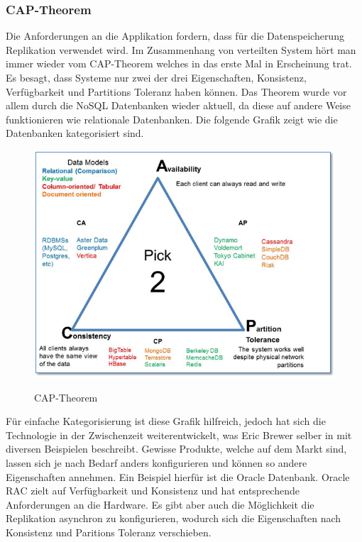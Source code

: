 \subsubsection{CAP-Theorem}
Die Anforderungen an die Applikation fordern, dass für die Datenspeicherung Replikation verwendet wird. Im Zusammenhang von verteilten System hört man immer wieder vom CAP-Theorem welches in \cite{brewcap} das erste Mal in Erscheinung trat. Es besagt, dass Systeme nur zwei der drei Eigenschaften, Konsistenz, Verfügbarkeit und Partitions Toleranz haben können. Das Theorem wurde vor allem durch die NoSQL Datenbanken wieder aktuell, da diese auf andere Weise funktionieren wie relationale Datenbanken. Die folgende Grafik zeigt wie die Datenbanken kategorisiert sind.
\begin{figure}[H]
	\centering
	\includegraphics[scale=0.60]{cap.png}\newline
	\caption{CAP-Theorem}
	\cite{cap}
\end{figure}
Für einfache Kategorisierung ist diese Grafik hilfreich, jedoch hat sich die Technologie in der Zwischenzeit weiterentwickelt, was Eric Brewer selber in \cite{capnew} mit diversen Beispielen beschreibt. Gewisse Produkte, welche auf dem Markt sind, lassen sich je nach Bedarf anders konfigurieren und können so andere Eigenschaften annehmen. Ein Beispiel hierfür ist die Oracle Datenbank. Oracle RAC zielt auf Verfügbarkeit und Konsistenz und hat entsprechende Anforderungen an die Hardware. Es gibt aber auch die Möglichkeit die Replikation asynchron zu konfigurieren, wodurch sich die Eigenschaften nach Konsistenz und Paritions Toleranz verschieben. 

